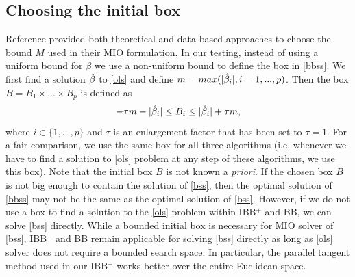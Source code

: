 \documentclass[10pt, letterpaper]{article}
\begin{document}
\subsection{Choosing the initial box}
Reference \cite{bertsimasEtal:2015} provided both theoretical and data-based approaches to choose the bound $M$ used in their MIO formulation. In our testing, instead of using a uniform bound for $\beta$ we use a non-uniform bound to define the box in \eqref{bbss}. We first find a solution $\Hat{\beta}$ to \eqref{ols} and define $m=max (|\Hat{\beta}_{i}|,i=1,...,p)$. Then the box $B=B_{1} \times  ... \times  B_{p}$  is defined as 
\[ - \tau m -|\Hat{\beta}_{i}| \leq B_{i} \leq |\Hat{\beta}_{i}|+ \tau m , \]
where $i\in \{1,...,p\}$ and $\tau$ is an enlargement factor that has been set to $\tau=1$.
For a fair comparison, we use the same box for all three algorithms (i.e. whenever we have to find a solution to \eqref{ols} problem at any step of these algorithms, we use this box). 
Note that the initial box $B$ is not known a \textit{priori}. If the chosen box $B$ is not big enough to contain the solution of \eqref{bss}, then the optimal solution of \eqref{bbss} may not be the same as the optimal solution of \eqref{bss}. However, if we do not use a box to find a solution to the \eqref{ols} problem within IBB$^{+}$ and BB, we can solve \eqref{bss} directly. While a bounded initial box is necessary for MIO solver of \eqref{bss}, IBB$^{+}$ and BB remain applicable for solving \eqref{bss} directly as long as \eqref{ols} solver does not require a bounded search space. In particular, the parallel tangent method used in our IBB$^{+}$ works better over the entire Euclidean space.
\end{document}
